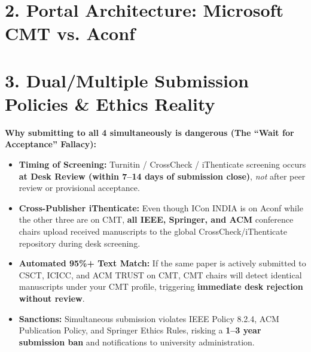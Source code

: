 \documentclass[10pt,a4paper]{article}
\begin{document}
\section*{\normalsize \color{primary}2. Portal Architecture: Microsoft CMT vs. Aconf}
\vspace{-6pt}
\noindent
{}

\vspace{5pt}
\section*{\normalsize \color{darkalert}3. Dual/Multiple Submission Policies \& Ethics Reality}
\vspace{-6pt}
\noindent
\colorbox{alertbg}{%
\parbox{0.985\textwidth}{%
\small
\textbf{\color{darkalert}Why submitting to all 4 simultaneously is dangerous (The ``Wait for Acceptance'' Fallacy):}
\begin{itemize}[leftmargin=12pt, itemsep=1pt, topsep=1pt]
\item \textbf{Timing of Screening:} Turnitin / CrossCheck / iThenticate screening occurs \textbf{at Desk Review (within 7--14 days of submission close)}, \emph{not} after peer review or provisional acceptance.
\item \textbf{Cross-Publisher iThenticate:} Even though ICon INDIA is on Aconf while the other three are on CMT, \textbf{all IEEE, Springer, and ACM} conference chairs upload received manuscripts to the global CrossCheck/iThenticate repository during desk screening.
\item \textbf{Automated 95\%+ Text Match:} If the same paper is actively submitted to CSCT, ICICC, and ACM TRUST on CMT, CMT chairs will detect identical manuscripts under your CMT profile, triggering \textbf{immediate desk rejection without review}.
\item \textbf{Sanctions:} Simultaneous submission violates IEEE Policy 8.2.4, ACM Publication Policy, and Springer Ethics Rules, risking a \textbf{1--3 year submission ban} and notifications to university administration.
\end{itemize}
}%
}
\end{document}
